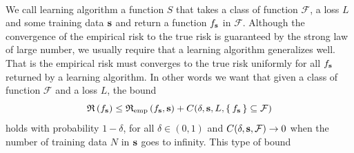 \paragraph{}
We call learning algorithm a function $S$ that takes a class of function
$\mathcal{F}$, a loss $L$ and some training data $\boldsymbol{\mathbf{s}}$ and return a
function $f_{\boldsymbol{\mathbf{s}}}$ in $\mathcal{F}$. Although the convergence of
the empirical risk to the true risk is guaranteed by the strong law of large
number, we usually require that a learning algorithm generalizes well. That is
the empirical risk must converges to the true risk uniformly for all
$f_{\boldsymbol{\mathbf{s}}}$ returned by a learning algorithm. In other words we want 
that given a class of function $\mathcal{F}$ and a loss $L$, the bound
\begin{dmath*}
    \risk{f_{\seq{s}}} \le \riskemp{f_{\seq{s}}, \seq{s}} + C(\delta, \seq{s},
    L, \set{f_{\seq{s}}}\subseteq\mathcal{F})
\end{dmath*}
holds with probability $1-\delta$, for all $\delta\in(0, 1)$ and $C(\delta,
\boldsymbol{\mathbf{s}}, \mathcal{F}) \to 0$ when the number of training data $N$ in $\boldsymbol{\mathbf{s}}$
goes to infinity. This type of bound
